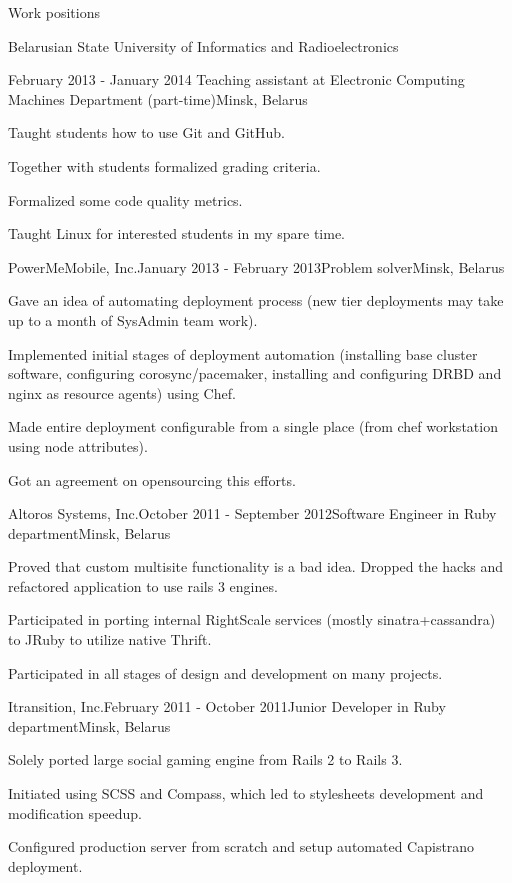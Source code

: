 \documentclass{resume} %
\begin{document}
\begin{rSection}{Work positions}
\begin{rSubsection}{\parbox[t][2em][t]{9cm}{Belarusian State University of Informatics and Radioelectronics}}{February 2013 - January 2014 }{Teaching assistant at Electronic Computing Machines Department (part-time)}{Minsk, Belarus}
\item Taught students how to use Git and GitHub.
\item Together with students formalized grading criteria.
\item Formalized some code quality metrics.
\item Taught Linux for interested students in my spare time.
\end{rSubsection}

\begin{rSubsection}{PowerMeMobile, Inc.}{January 2013 - February 2013}{Problem solver}{Minsk, Belarus}
\item Gave an idea of automating deployment process (new tier deployments may take up to
  a month of SysAdmin team work).
\item Implemented initial stages of deployment automation (installing base cluster software,
  configuring corosync/pacemaker, installing and configuring DRBD and nginx as resource agents) using Chef.
\item Made entire deployment configurable from a single place (from chef workstation using node attributes).
\item Got an agreement on opensourcing this efforts.
\end{rSubsection}

\begin{rSubsection}{Altoros Systems, Inc.}{October 2011 - September 2012}{Software Engineer in Ruby department}{Minsk, Belarus}
\item Proved that custom multisite functionality is a bad idea. Dropped the hacks and refactored application to use rails 3 engines.
\item Participated in porting internal RightScale services (mostly sinatra+cassandra) to JRuby to utilize native Thrift.
\item Participated in all stages of design and development on many projects.
\end{rSubsection}

\begin{rSubsection}{Itransition, Inc.}{February 2011 - October 2011}{Junior Developer in Ruby department}{Minsk, Belarus}
\item Solely ported large social gaming engine from Rails 2 to Rails 3.
\item Initiated using SCSS and Compass, which led to stylesheets development and modification speedup.
\item Configured production server from scratch and setup automated Capistrano deployment.
\end{rSubsection}

\end{rSection}
\end{document}

